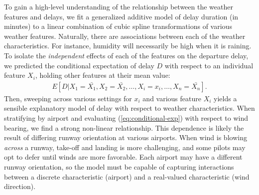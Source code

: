 \documentclass[twocolumn]{article}
\begin{document}
To gain a high-level understanding of the relationship between the weather features and delays, we fit a generalized additive model \citep{hastie1990generalized} of delay duration (in minutes) to a linear combination of cubic spline transformations of various weather features. Naturally, there are associations between each of the weather characteristics. For instance, humidity will necessarily be high when it is raining. To isolate the \emph{independent} effects of each of the features on the departure delay, we predicted the conditional expectation of delay $D$ with respect to an individual feature $X_i$, holding other features at their mean value:
\begin{align}
    \label{eq:conditional-exp}
    E[D|X_1=\bar{X_1}, X_2=\bar{X_2}, \ldots, X_i = x_i, \ldots, X_n = \bar{X_n}].
\end{align}
Then, sweeping across various settings for $x_i$ and various feature $X_i$ yields a sensible explanatory model of delay with respect to weather characteristics. When stratifying by airport and evaluating (\ref{eq:conditional-exp}) with respect to wind bearing, we find a strong non-linear relationship. This dependence is likely the result of differing runway orientation at various airports. When wind is blowing \emph{across} a runway, take-off and landing is more challenging, and some pilots may opt to defer until winds are more favorable. Each airport may have a different runway orientation, so the model must be capable of capturing interactions between a discrete characteristic (airport) and a real-valued characteristic (wind direction).
\end{document}
